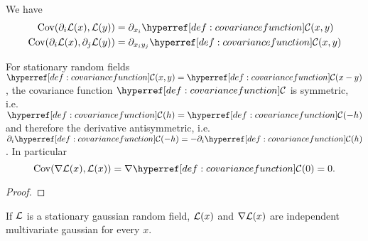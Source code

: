 \begin{lemma}
	\label{lem: covariance of derivative}
	We have
	\begin{align*}
		\Cov(\partial_i\Loss(x), \Loss(y)) &= \partial_{x_i} \C(x,y)\\
		\Cov(\partial_i\Loss(x), \partial_j \Loss(y)) &= \partial_{x_i y_j} \C(x,y)
	\end{align*}
\end{lemma}
\begin{remark}\label{rem: covariance uncorrelated}
	For stationary random fields \(\C(x,y)=\C(x-y)\), the covariance
	function \(\C\) is symmetric, i.e. \(\C(h)=\C(-h)\)
	and therefore the derivative antisymmetric, i.e.
	\(\partial_i\C(-h)=-\partial_i\C(h)\). In particular
	\begin{equation*}
		\Cov(\nabla\Loss(x), \Loss(x)) = \nabla \C(0)=0.
	\end{equation*}
\end{remark}
\begin{proof}
	
\end{proof}
\begin{corollary}
	If \(\mathcal{L}\) is a stationary gaussian random field, \(\mathcal{L}(x)\) and
	\(\nabla\mathcal{L}(x)\) are independent multivariate gaussian for every \(x\).
\end{corollary}

